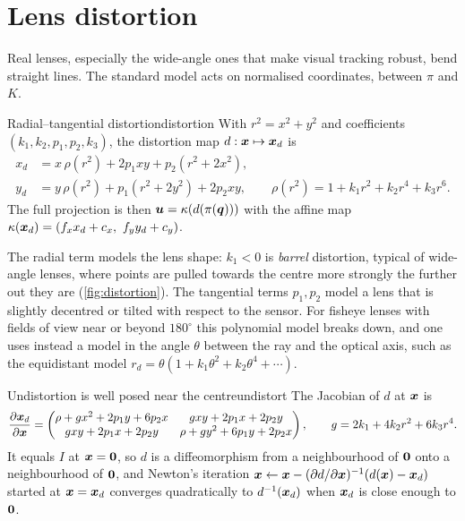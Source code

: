 \section{Lens distortion}

Real lenses, especially the wide-angle ones that make visual tracking
robust, bend straight lines. The standard model acts on normalised
coordinates, between $\pi$ and $K$.

\begin{definition}{Radial--tangential distortion}{distortion}
With $r^2=x^2+y^2$ and coefficients $(k_1,k_2,p_1,p_2,k_3)$, the
distortion map $d:\bm{x}\mapsto\bm{x}_d$ is
\begin{align*}
x_d&=x\,\rho(r^2)+2p_1xy+p_2(r^2+2x^2),\\
y_d&=y\,\rho(r^2)+p_1(r^2+2y^2)+2p_2xy,\qquad
\rho(r^2)=1+k_1r^2+k_2r^4+k_3r^6 .
\end{align*}
The full projection is then $\bm{u}=\kappa(d(\pi(\bm{q})))$ with the
affine map $\kappa(\vect{x}_d)=(f_xx_d+c_x,\ f_yy_d+c_y)$.
\end{definition}

The radial term models the lens shape: $k_1<0$ is \emph{barrel}
distortion, typical of wide-angle lenses, where points are pulled
towards the centre more strongly the further out they are
(\cref{fig:distortion}). The tangential terms $p_1,p_2$ model a lens that
is slightly decentred or tilted with respect to the sensor. For fisheye
lenses with fields of view near or beyond $180^\circ$ this polynomial
model breaks down, and one uses instead a model in the angle $\theta$
between the ray and the optical axis, such as the equidistant model
$r_d=\theta(1+k_1\theta^2+k_2\theta^4+\cdots)$.

\begin{proposition}{Undistortion is well posed near the centre}{undistort}
The Jacobian of $d$ at $\bm{x}$ is
\[
\frac{\partial\bm{x}_d}{\partial\bm{x}}=
\begin{pmatrix}
\rho+gx^2+2p_1y+6p_2x & gxy+2p_1x+2p_2y\\
gxy+2p_1x+2p_2y & \rho+gy^2+6p_1y+2p_2x
\end{pmatrix},\qquad g=2k_1+4k_2r^2+6k_3r^4 .
\]
It equals $I$ at $\bm{x}=\bm{0}$, so $d$ is a diffeomorphism from a
neighbourhood of $\bm{0}$ onto a neighbourhood of $\bm{0}$, and Newton's
iteration $\bm{x}\leftarrow\bm{x}-(\partial d/\partial\bm{x})^{-1}
(d(\bm{x})-\bm{x}_d)$ started at $\bm{x}=\bm{x}_d$ converges
quadratically to $d^{-1}(\bm{x}_d)$ when $\bm{x}_d$ is close enough
to $\bm{0}$.
\end{proposition}

